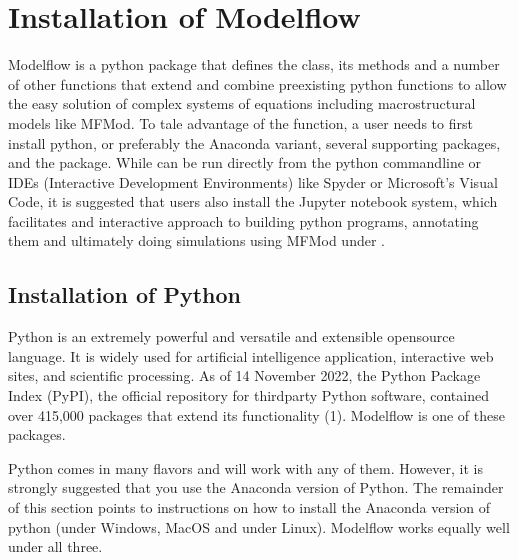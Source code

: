 \documentclass[letterpaper,10pt,english]{jupyterBook}
\begin{document}
\sphinxstepscope


\chapter{Installation of Modelflow}
\label{\detokenize{content/03_Installation/InstallingPython:installation-of-modelflow}}\label{\detokenize{content/03_Installation/InstallingPython::doc}}
\sphinxAtStartPar
Modelflow is a python package that defines the  class, its methods and a number of other functions that extend and combine pre\sphinxhyphen{}existing python functions to allow the easy solution of complex systems of equations including macro\sphinxhyphen{}structural models like MFMod.  To tale advantage of the function, a user needs to first install python, or preferably the Anaconda variant, several supporting packages, and the  package.  While  can be run directly from the python command\sphinxhyphen{}line or IDEs (Interactive Development Environments) like Spyder or Microsoft’s Visual Code, it is suggested that users also install the Jupyter notebook system, which facilitates and interactive approach to building python programs, annotating them and ultimately doing simulations using MFMod under .


\section{Installation of Python}
\label{\detokenize{content/03_Installation/InstallingPython:installation-of-python}}
\sphinxAtStartPar
Python is an extremely powerful and versatile and extensible open\sphinxhyphen{}source language. It is widely used for artificial intelligence application, interactive web sites, and scientific processing. As of 14 November 2022, the Python Package Index (PyPI), the official repository for third\sphinxhyphen{}party Python software, contained over 415,000 packages that extend its functionality (1). Modelflow is one of these packages.

\sphinxAtStartPar
Python comes in many flavors and  will work with any of them.  However, it is strongly suggested that you use the Anaconda version of Python.  The remainder of this section points to instructions on how to install the Anaconda version of python (under Windows, MacOS and under Linux). Modelflow works equally well under all three.
\end{document}

